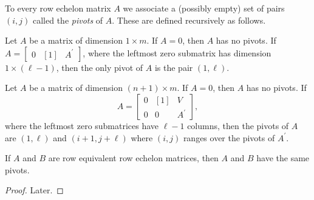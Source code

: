 \documentclass{memoir}
\begin{document}
\begin{dfn}
To every row echelon matrix $A$ we associate a (possibly empty) set of pairs $(i,j)$ called the \emph{pivots} of $A$. These are defined recursively as follows.
\begin{enumerate*}
\item Let $A$ be a matrix of dimension $1 \times m$. If $A = 0$, then $A$ has no pivots. If $A = \left[ \begin{array}{c|c|c} 0 & [1] & A^\prime \end{array} \right]$, where the leftmost zero submatrix has dimension $1 \times (\ell-1)$, then the only pivot of $A$ is the pair $(1,\ell)$.
\item Let $A$ be a matrix of dimension $(n + 1) \times m$. If $A = 0$, then $A$ has no pivots. If \[ A = \left[ \begin{array}{c|c|c} 0 & [1] & V \\ \hline 0 & 0 & A^\prime \end{array} \right], \] where the leftmost zero submatrices have $\ell-1$ columns, then the pivots of $A$ are $(1,\ell)$ and $(i+1,j+\ell)$ where $(i,j)$ ranges over the pivots of $A^\prime$.
\end{enumerate*}
\end{dfn}

\begin{prp}
If $A$ and $B$ are row equivalent row echelon matrices, then $A$ and $B$ have the same pivots.
\end{prp}

\begin{proof}
Later.
\end{proof}
\end{document}
